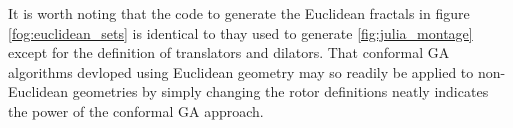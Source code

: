 It is worth noting that the code to generate the Euclidean fractals in figure 
\ref{fog:euclidean_sets} is identical to thay used to generate
\ref{fig:julia_montage} except for the 
definition of translators and dilators.
That conformal GA algorithms devloped using Euclidean geometry may so readily
be applied to non-Euclidean geometries by simply changing the rotor definitions neatly
indicates the power of the conformal GA approach.



